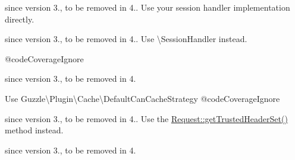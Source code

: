 \begin{DoxyRefList}
since version 3., to be removed in 4.. Use your session handler implementation directly. 
\item[Class \mbox{\hyperlink{class_symfony_1_1_component_1_1_http_foundation_1_1_session_1_1_storage_1_1_handler_1_1_native_session_handler}{Native\+Session\+Handler}} ]\label{deprecated__deprecated000057}%
%
since version 3., to be removed in 4.. Use \textbackslash{}\+Session\+Handler instead.  
\item[Global \mbox{\hyperlink{class_guzzle_1_1_http_1_1_message_1_1_post_file_a7fd16b963104d7fafd73c24f484292f2}{Post\+File\+::get\+Curl\+String}} ()]\label{deprecated__deprecated000018}%
%
 @code\+Coverage\+Ignore  
\item[Global \mbox{\hyperlink{class_symfony_1_1_component_1_1_http_foundation_1_1_request_a21e654c064e3789483f705d66af59012}{Request\+::\$trusted\+Headers}} ]\label{deprecated__deprecated000051}%
%
since version 3., to be removed in 4.  
\item[Global \mbox{\hyperlink{class_guzzle_1_1_http_1_1_message_1_1_request_a34085b9edc4047d71a8473c57f158b4f}{Request\+::can\+Cache}} ()]\label{deprecated__deprecated000020}%
%
Use Guzzle\textbackslash{}\+Plugin\textbackslash{}\+Cache\textbackslash{}\+Default\+Can\+Cache\+Strategy @code\+Coverage\+Ignore  
\item[Global \mbox{\hyperlink{class_symfony_1_1_component_1_1_http_foundation_1_1_request_aac7c875b985fda9e58ee133246c30095}{Request\+::get\+Trusted\+Header\+Name}} (\$key)]\label{deprecated__deprecated000054}%
%
since version 3., to be removed in 4.. Use the \mbox{\hyperlink{class_symfony_1_1_component_1_1_http_foundation_1_1_request_a46ef68401e03b81ae8b087cfbf7840b3}{Request\+::get\+Trusted\+Header\+Set()}} method instead.  
\item[Global \mbox{\hyperlink{class_symfony_1_1_component_1_1_http_foundation_1_1_request_a429dfd7389324bea20b9961e725ee183}{Request\+::HEADER\+\_\+\+CLIENT\+\_\+\+HOST}} ]\label{deprecated__deprecated000048}%
%
since version 3., to be removed in 4.  
\item[Global \mbox{\hyperlink{class_symfony_1_1_component_1_1_http_foundation_1_1_request_a72aeb32d07883a3a72f1dc8544d216ab}{Request\+::HEADER\+\_\+\+CLIENT\+\_\+\+IP}} ]\label{deprecated__deprecated000047}%

\end{DoxyRefList}
